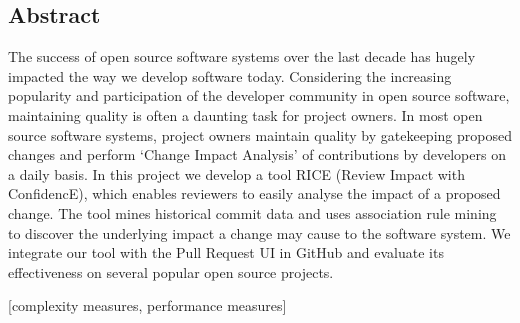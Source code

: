 
\subsection*{Abstract}
The success of open source software systems over the last decade has hugely impacted the way we develop software today. Considering the increasing popularity and participation of the developer community in open source software, maintaining quality is often a daunting task for project owners. In most open source software systems, project owners maintain quality by gatekeeping proposed changes and perform `Change Impact Analysis' of contributions by developers on a daily basis. In this project we develop a tool RICE (Review Impact with ConfidencE), which enables reviewers to easily analyse the impact of a proposed change. The tool mines historical commit data and uses association rule mining to discover the underlying impact a change may cause to the software system. We integrate our tool with the Pull Request UI in GitHub and evaluate its effectiveness on several popular open source projects.



[complexity measures, performance measures]


